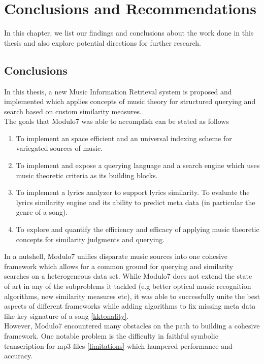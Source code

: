\chapter{Conclusions and Recommendations}

\noindent In this chapter, we list our findings and conclusions about the work done in this thesis and also explore potential directions for further research. 
 
\section{Conclusions}

\noindent In this thesis, a new Music Information Retrieval system is proposed and implemented which applies concepts of music theory for structured querying and search based on custom similarity measures. \\

\noindent The goals that Modulo7 was able to accomplish can be stated as follows
\begin{enumerate}
\item To implement an space efficient and an universal indexing scheme for variegated sources of music.
\item To implement and expose a querying language and a search engine  which uses music theoretic criteria as its building blocks. 
\item To implement a lyrics analyzer to support lyrics similarity. To evaluate the lyrics similarity engine and its ability to predict meta data (in particular the genre of a song).  
\item To explore and quantify the efficiency and efficacy of applying music theoretic concepts for similarity judgments and querying.
\end{enumerate} 

\noindent In a nutshell, Modulo7 unifies disparate music sources into one cohesive framework which allows for a common ground for querying and similarity searches on a heterogeneous data set. While Modulo7 does not extend the state of art in any of the subproblems it tackled (e.g better optical music recognition algorithms, new similarity measures etc), it was able to successfully unite the best aspects of different frameworks while adding algorithms to fix missing meta data like key signature of a song \ref{kktonality}. \\

\noindent However, Modulo7 encountered many obstacles on the path to building a cohesive framework. One notable problem is the difficulty in faithful symbolic transcription for mp3 files \ref{limitations} which hampered performance and accuracy. 

